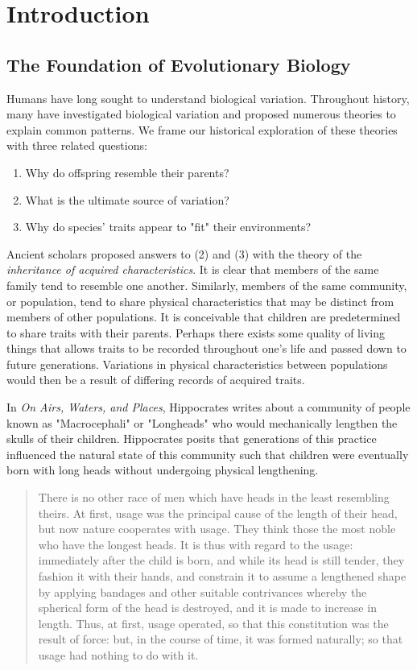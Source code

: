 \chapter{Introduction}
\section{The Foundation of Evolutionary Biology}
Humans have long sought to understand biological variation. Throughout history, many have investigated biological variation and proposed numerous theories to explain common patterns. We frame our historical exploration of these theories with three related questions:

\begin{enumerate}
    \item Why do offspring resemble their parents?
    \item What is the ultimate source of variation?
    \item Why do species' traits appear to "fit" their environments?
\end{enumerate}
 
Ancient scholars proposed answers to (2) and (3) with the theory of the \textit{inheritance of acquired characteristics}. It is clear that members of the same family tend to resemble one another. Similarly, members of the same community, or population, tend to share physical characteristics that may be distinct from members of other populations. It is conceivable that children are predetermined to share traits with their parents. Perhaps there exists some quality of living things that allows traits to be recorded throughout one's life and passed down to future generations. Variations in physical characteristics between populations would then be a result of differing records of acquired traits.   

In \textit{On Airs, Waters, and Places}, Hippocrates writes about a community of people known as "Macrocephali" or "Longheads" who would mechanically lengthen the skulls of their children. Hippocrates posits that generations of this practice influenced the natural state of this community such that children were eventually born with long heads without undergoing physical lengthening. 
\begin{quote}
    There is no other race of men which have heads in the least resembling theirs. At first, usage was the principal cause of the length of their head, but now nature cooperates with usage. They think those the most noble who have the longest heads. It is thus with regard to the usage: immediately after the child is born, and while its head is still tender, they fashion it with their hands, and constrain it to assume a lengthened shape by applying bandages and other suitable contrivances whereby the spherical form of the head is destroyed, and it is made to increase in length. Thus, at first, usage operated, so that this constitution was the result of force: but, in the course of time, it was formed naturally; so that usage had nothing to do with it. \cite{hippocrates_airs_waters_places}
\end{quote} 


